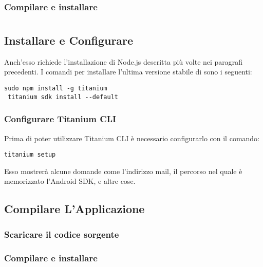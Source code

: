         \subsubsection{Compilare e installare}


\section{\tisdk{}}

    \subsection{Installare e Configurare \tisdk{}}
    Anch'esso richiede l'installazione di Node.js descritta più volte nei
    paragrafi precedenti. I comandi per installare l'ultima versione stabile
    di \tisdk{} sono i seguenti:
    \begin{lstlisting}[language=plane]
 sudo npm install -g titanium
 titanium sdk install --default
    \end{lstlisting}
        \subsubsection{Configurare Titanium CLI}
        Prima di poter utilizzare Titanium CLI è necessario configurarlo con
        il comando:
    \begin{lstlisting}[language=plane]
 titanium setup
    \end{lstlisting}
    Esso mostrerà alcune domande come l'indirizzo mail, il percorso nel quale
    è memorizzato l'Android SDK, e altre cose.
    
    \subsection{Compilare L'Applicazione}
        \subsubsection{Scaricare il codice sorgente}
        \subsubsection{Compilare e installare}
